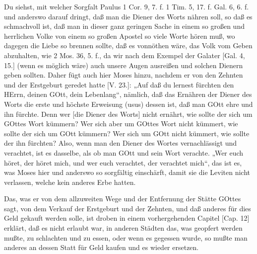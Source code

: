 Du siehst, mit welcher Sorgfalt Paulus 1 Cor. 9, 7. f. 1 Tim. 5, 17. f. Gal. 6, 6. f. und anderswo darauf dringt, daß man die Diener des Worts nähren soll, so daß es schmachvoll ist, daß man in dieser ganz geringen Sache in einem so großen und herrlichen Volke von einem so großen Apostel so viele Worte hören muß, wo dagegen die Liebe so brennen sollte, daß es vonnöthen wäre, das Volk vom Geben abzuhalten, wie 2 Mos. 36, 5. f., da wir nach dem Exempel der Galater [Gal. 4, 15.] (wenn es möglich wäre) auch unsere Augen ausreißen und solchen Dienern geben sollten. Daher fügt auch hier Moses hinzu, nachdem er von den Zehnten und der Erstgeburt geredet hatte [V. 23.]: „Auf daß du lernest fürchten den HErrn, deinen GOtt, dein Lebenlang“, nämlich, daß das Ernähren der Diener des Worts die erste und höchste Erweisung (usus) dessen ist, daß man GOtt ehre und ihn fürchte. Denn wer [die Diener des Worts] nicht ernährt, wie sollte der sich um GOttes Wort kümmern? Wer sich aber um GOttes Wort nicht kümmert, wie sollte der sich um GOtt kümmern? Wer sich um GOtt nicht kümmert, wie sollte der ihn fürchten? Also, wenn man den Diener des Wortes vernachlässigt und verachtet, ist es dasselbe, als ob man GOtt und sein Wort verachte. „Wer euch höret, der höret mich, und wer euch verachtet, der verachtet mich“, das ist es, was Moses hier und anderswo so sorgfältig einschärft, damit sie die Leviten nicht verlassen, welche kein anderes Erbe hatten.

Das, was er von dem allzuweiten Wege und der Entfernung der Stätte GOttes sagt, von dem Verkauf der Erstgeburt und der Zehnten, und daß anderes für dies Geld gekauft werden solle, ist droben in einem vorhergehenden Capitel [Cap. 12] erklärt, daß es nicht erlaubt war, in anderen Städten das, was geopfert werden mußte, zu schlachten und zu essen, oder wenn es gegessen wurde, so mußte man anderes an dessen Statt für Geld kaufen und es wieder ersetzen.

